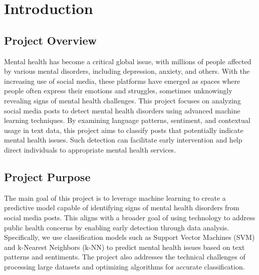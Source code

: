 
\section{Introduction}

\begin{comment}
    Briefly introduce the project's overall topic and purpose.
    \vspace{.1in}
    
    \noindent
    Provide specifications of Technical domain (Hardware, Operating System, Software) and Business domain.
    \vspace{.1in}
    
    \noindent
    Provide \textbf{Glossary} / Keywords in a tabular format.
\end{comment}


\subsection{Project Overview}
\vspace{.1in}
\noindent
Mental health has become a critical global issue, with millions of people affected by various mental disorders, including depression, anxiety, and others. With the increasing use of social media, these platforms have emerged as spaces where people often express their emotions and struggles, sometimes unknowingly revealing signs of mental health challenges. This project focuses on analyzing social media posts to detect mental health disorders using advanced machine learning techniques. By examining language patterns, sentiment, and contextual usage in text data, this project aims to classify posts that potentially indicate mental health issues. Such detection can facilitate early intervention and help direct individuals to appropriate mental health services.

\subsection{Project Purpose}
\vspace{.1in}
\noindent
The main goal of this project is to leverage machine learning to create a predictive model capable of identifying signs of mental health disorders from social media posts. This aligns with a broader goal of using technology to address public health concerns by enabling early detection through data analysis. Specifically, we use classification models such as Support Vector Machines (SVM) and k-Nearest Neighbors (k-NN) to predict mental health issues based on text patterns and sentiments. The project also addresses the technical challenges of processing large datasets and optimizing algorithms for accurate classification.

